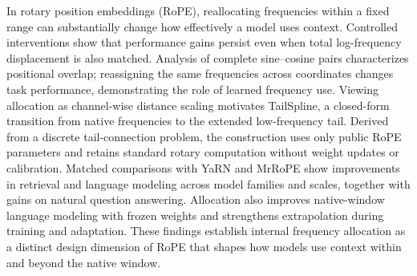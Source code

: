 In rotary position embeddings (RoPE), reallocating frequencies within a fixed range can substantially change how effectively a model uses context. Controlled interventions show that performance gains persist even when total log-frequency displacement is also matched. Analysis of complete sine--cosine pairs characterizes positional overlap; reassigning the same frequencies across coordinates changes task performance, demonstrating the role of learned frequency use. Viewing allocation as channel-wise distance scaling motivates TailSpline, a closed-form transition from native frequencies to the extended low-frequency tail. Derived from a discrete tail-connection problem, the construction uses only public RoPE parameters and retains standard rotary computation without weight updates or calibration. Matched comparisons with YaRN and MrRoPE show improvements in retrieval and language modeling across model families and scales, together with gains on natural question answering. Allocation also improves native-window language modeling with frozen weights and strengthens extrapolation during training and adaptation. These findings establish internal frequency allocation as a distinct design dimension of RoPE that shapes how models use context within and beyond the native window.
